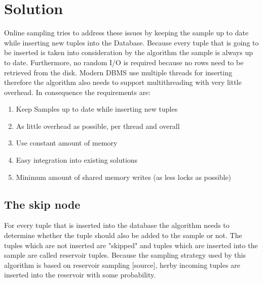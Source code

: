 \documentclass[acmlarge,nonacm]{acmart}
\begin{document}
    \section{Solution}
        Online sampling tries to address these issues by keeping the sample up to date while inserting new tuples into the Database. Because every tuple that is going to be inserted is taken into consideration by the algorithm the sample is always up to date. Furthermore, no random I/O is required because no rows need to be retrieved from the disk. Modern DBMS use multiple threads for inserting therefore the algorithm also needs to support multithreading with very little overhead.
        In consequence the requirements are:
        \begin{enumerate}
            \item Keep Samples up to date while inserting new tuples
            \item As little overhead as possible, per thread and overall
            \item Use constant amount of memory
            \item Easy integration into existing solutions
            \item Minimum amount of shared memory writes (as less locks as possible)
        \end{enumerate}
        
    \subsection{The skip node}
        For every tuple that is inserted into the database the algorithm needs to determine whether the tuple should also be added to the sample or not. The tuples which are not inserted are "skipped" and tuples which are inserted into the sample are called reservoir tuples. Because the sampling strategy used by this algorithm is based on reservoir sampling [source], herby incoming tuples are inserted into the reservoir with some probability. 
        
\end{document}

